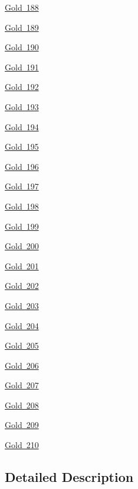 \begin{DoxyCompactItemize}
\item 
\mbox{\hyperlink{group___isotope_const-_gold-_au188}{Gold 188}}
\item 
\mbox{\hyperlink{group___isotope_const-_gold-_au189}{Gold 189}}
\item 
\mbox{\hyperlink{group___isotope_const-_gold-_au190}{Gold 190}}
\item 
\mbox{\hyperlink{group___isotope_const-_gold-_au191}{Gold 191}}
\item 
\mbox{\hyperlink{group___isotope_const-_gold-_au192}{Gold 192}}
\item 
\mbox{\hyperlink{group___isotope_const-_gold-_au193}{Gold 193}}
\item 
\mbox{\hyperlink{group___isotope_const-_gold-_au194}{Gold 194}}
\item 
\mbox{\hyperlink{group___isotope_const-_gold-_au195}{Gold 195}}
\item 
\mbox{\hyperlink{group___isotope_const-_gold-_au196}{Gold 196}}
\item 
\mbox{\hyperlink{group___isotope_const-_gold-_au197}{Gold 197}}
\item 
\mbox{\hyperlink{group___isotope_const-_gold-_au198}{Gold 198}}
\item 
\mbox{\hyperlink{group___isotope_const-_gold-_au199}{Gold 199}}
\item 
\mbox{\hyperlink{group___isotope_const-_gold-_au200}{Gold 200}}
\item 
\mbox{\hyperlink{group___isotope_const-_gold-_au201}{Gold 201}}
\item 
\mbox{\hyperlink{group___isotope_const-_gold-_au202}{Gold 202}}
\item 
\mbox{\hyperlink{group___isotope_const-_gold-_au203}{Gold 203}}
\item 
\mbox{\hyperlink{group___isotope_const-_gold-_au204}{Gold 204}}
\item 
\mbox{\hyperlink{group___isotope_const-_gold-_au205}{Gold 205}}
\item 
\mbox{\hyperlink{group___isotope_const-_gold-_au206}{Gold 206}}
\item 
\mbox{\hyperlink{group___isotope_const-_gold-_au207}{Gold 207}}
\item 
\mbox{\hyperlink{group___isotope_const-_gold-_au208}{Gold 208}}
\item 
\mbox{\hyperlink{group___isotope_const-_gold-_au209}{Gold 209}}
\item 
\mbox{\hyperlink{group___isotope_const-_gold-_au210}{Gold 210}}
\end{DoxyCompactItemize}


\subsection{Detailed Description}
